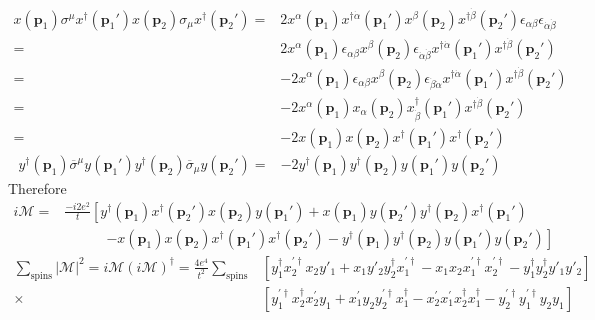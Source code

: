 \begin{align}
  x(\mathbf{p}_1) {\sigma}^{\mu}x^{\dagger}(\mathbf{p}_1')x(\mathbf{p}_2) {\sigma}_{\mu}x^{\dagger}(\mathbf{p}_2')
  =&2x^{\alpha}(\mathbf{p}_1) x^{\dagger\dot{\alpha}}(\mathbf{p}_1')x^{\beta}(\mathbf{p}_2) x^{\dagger\dot{\beta}}(\mathbf{p}_2')\epsilon_{\alpha\beta}\epsilon_{\dot{\alpha}\dot{\beta}} \nonumber\\
  =&2x^{\alpha}(\mathbf{p}_1)\epsilon_{\alpha\beta}x^{\beta}(\mathbf{p}_2) \epsilon_{\dot{\alpha}\dot{\beta}}x^{\dagger\dot{\alpha}}(\mathbf{p}_1') x^{\dagger\dot{\beta}}(\mathbf{p}_2') \nonumber\\
  =&-2x^{\alpha}(\mathbf{p}_1)\epsilon_{\alpha\beta}x^{\beta}(\mathbf{p}_2) \epsilon_{\dot{\beta}\dot{\alpha}}x^{\dagger\dot{\alpha}}(\mathbf{p}_1') x^{\dagger\dot{\beta}}(\mathbf{p}_2') \nonumber\\
  =&-2x^{\alpha}(\mathbf{p}_1)x_{\alpha}(\mathbf{p}_2)x^{\dagger}_{\dot{\beta}}(\mathbf{p}_1') x^{\dagger\dot{\beta}}(\mathbf{p}_2') \nonumber\\
  =&-2x(\mathbf{p}_1)x(\mathbf{p}_2)x^{\dagger}(\mathbf{p}_1')x^{\dagger}(\mathbf{p}_2')
\end{align}
\begin{align}
  y^{\dagger}(\mathbf{p}_1) \overline{\sigma}^{\mu} y(\mathbf{p}_1')y^{\dagger}(\mathbf{p}_2) \overline{\sigma}_{\mu} y(\mathbf{p}_2')
=& -2 y^{\dagger}(\mathbf{p}_1)y^{\dagger}(\mathbf{p}_2)y(\mathbf{p}_1')y(\mathbf{p}_2')
\end{align}
Therefore %
\begin{align}
  i\mathcal{M}=&\frac{-i2e^2}{t}\left[y^{\dagger}(\mathbf{p}_1)x^{\dagger}(\mathbf{p}_2')x(\mathbf{p}_2)y(\mathbf{p}_1')
+x(\mathbf{p}_1)y(\mathbf{p}_2') y^{\dagger}(\mathbf{p}_2)x^{\dagger}(\mathbf{p}_1') \right. \nonumber\\
&\qquad\quad \left.  -x(\mathbf{p}_1)x(\mathbf{p}_2)x^{\dagger}(\mathbf{p}_1')x^{\dagger}(\mathbf{p}_2')
-y^{\dagger}(\mathbf{p}_1)y^{\dagger}(\mathbf{p}_2)y(\mathbf{p}_1')y(\mathbf{p}_2') \right]
\end{align}
\begin{align}
  \sum_{\text{spins}}|\mathcal{M}|^2=i\mathcal{M}\left(i \mathcal{M} \right)^{\dagger}=
\frac{4e^4}{t^2}\sum_{\text{spins}}
&\left[y^{\dagger}_1x^{\prime\dagger}_2x_2y'_1
+x_1y'_2 y^{\dagger}_2x^{\prime\dagger}_1 -x_1x_2x^{\prime\dagger}_1x^{\prime\dagger}_2
-y^{\dagger}_1y^{\dagger}_2y'_1y'_2 \right] \nonumber\\
\times&\left[y^{\prime\dagger}_1x_2^{\dagger} x^{\prime}_2y_1
+x^{\prime}_1y_2 y^{\prime\dagger}_2x_1^{\dagger}  -x^{\prime}_2 x^{\prime}_1 x_2^{\dagger} x_1^{\dagger}
-y_2^{\prime\dagger} y_1^{\prime\dagger} y_2 y_1 \right]
\end{align}
